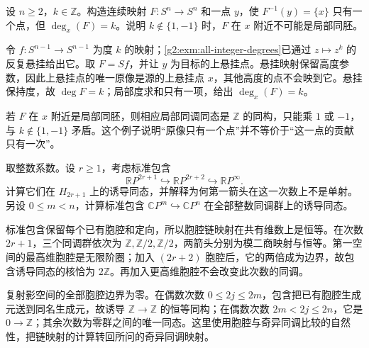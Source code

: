 \begin{exercise}\label{g2:ex:isolated-local-degree}
	设 \(n\ge2\)，\(k\in\mathbb Z\)。构造连续映射 \(F:S^n\rightarrow S^n\) 和一点 \(y\)，使 \(F^{-1}(y)=\{x\}\) 只有一个点，但 \(\deg_x(F)=k\)。说明 \(k\notin\{1,-1\}\) 时，\(F\) 在 \(x\) 附近不可能是局部同胚。
\end{exercise}
\begin{solution}
	令 \(f:S^{n-1}\rightarrow S^{n-1}\) 为度 \(k\) 的映射；\cref{g2:exm:all-integer-degrees}已通过 \(z\mapsto z^k\) 的反复悬挂给出它。取 \(F=Sf\)，并让 \(y\) 为目标的上悬挂点。悬挂映射保留高度参数，因此上悬挂点的唯一原像是源的上悬挂点 \(x\)，其他高度的点不会映到它。悬挂保持度，故 \(\deg F=k\)；局部度求和只有一项，给出 \(\deg_x(F)=k\)。

	若 \(F\) 在 \(x\) 附近是局部同胚，则相应局部同调同态是 \(\mathbb Z\) 的同构，只能乘 \(1\) 或 \(-1\)，与 \(k\notin\{1,-1\}\) 矛盾。这个例子说明“原像只有一个点”并不等价于“这一点的贡献只有一次”。
\end{solution}

\begin{exercise}\label{g2:ex:projective-inclusion-homology}
	取整数系数。设 \(r\geq1\)，考虑标准包含
	\[
		\mathbb RP^{2r+1}\hookrightarrow\mathbb RP^{2r+2}
		\hookrightarrow\mathbb RP^\infty.
	\]
	计算它们在 \(H_{2r+1}\) 上的诱导同态，并解释为何第一箭头在这一次数上不是单射。另设 \(0\leq m<n\)，计算标准包含 \(\mathbb CP^m\hookrightarrow\mathbb CP^n\) 在全部整数同调群上的诱导同态。
\end{exercise}
\begin{solution}
	标准包含保留每个已有胞腔和定向，所以胞腔链映射在共有维数上是恒等。在次数 \(2r+1\)，三个同调群依次为 \(\mathbb Z,\mathbb Z/2,\mathbb Z/2\)，两箭头分别为模二商映射与恒等。第一空间的最高维胞腔是无限阶圈；加入 \((2r+2)\) 胞腔后，它的两倍成为边界，故包含诱导同态的核恰为 \(2\mathbb Z\)。再加入更高维胞腔不会改变此次数的同调。

	复射影空间的全部胞腔边界为零。在偶数次数 \(0\leq2j\leq2m\)，包含把已有胞腔生成元送到同名生成元，故诱导 \(\mathbb Z\to\mathbb Z\) 的恒等同构；在偶数次数 \(2m<2j\leq2n\)，它是 \(0\to\mathbb Z\)；其余次数为零群之间的唯一同态。这里使用胞腔与奇异同调比较的自然性，把链映射的计算转回所问的奇异同调映射。
\end{solution}


